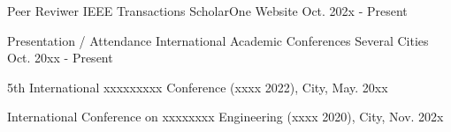 \vspace{-3mm} 

\begin{cventries}
	
\vspace{1mm} 	
	\cventry
	{Peer Reviwer} %
	{IEEE Transactions } %
	{ScholarOne Website}%
	{Oct. 202x - Present} %
	{
	}


	\cventry
{Presentation / Attendance} %
{International Academic Conferences} %
{Several Cities}%
{Oct. 20xx - Present} %
{
	\begin{cvitems} %
		\item {5th International xxxxxxxxx Conference (xxxx 2022), City, May. 20xx}
		\item{International Conference on xxxxxxxx Engineering (xxxx 2020), City, Nov. 202x}
	\end{cvitems}
}

\vspace{-4.0mm}  

 
\end{cventries}
